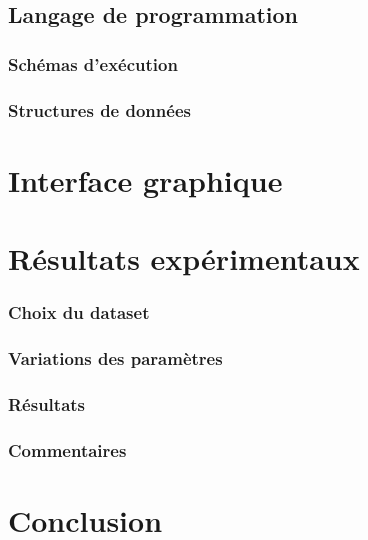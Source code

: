 		\subsection{Langage de programmation}
		\subsubsection{Schémas d'exécution}
		\subsubsection{Structures de données}
	\section{Interface graphique}
	
	\section{Résultats expérimentaux}
		\subsubsection{Choix du dataset}
		\subsubsection{Variations des paramètres}
		\subsubsection{Résultats}
	\subsubsection{Commentaires}
	
	\section{Conclusion}
